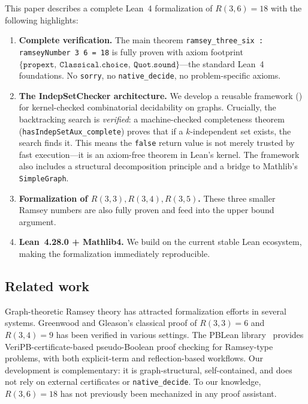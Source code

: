 \documentclass[11pt]{article}
\newcommand{\lean}[1]{\texttt{#1}}
\newcommand{\RR}[2]{R(#1,#2)}
\begin{document}
This paper describes a complete Lean~4 formalization of $R(3,6) = 18$
with the following highlights:

\begin{enumerate}
\item \textbf{Complete verification.}
  The main theorem \lean{ramsey\_three\_six : ramseyNumber 3 6 = 18} is fully
  proven with axiom footprint
  $\{\lean{propext},\ \lean{Classical.choice},\ \lean{Quot.sound}\}$---the
  standard Lean~4 foundations.
  No \lean{sorry}, no \lean{native\_decide}, no problem-specific axioms.

\item \textbf{The IndepSetChecker architecture.}
  We develop a reusable framework () for kernel-checked
  combinatorial decidability on graphs.
  Crucially, the backtracking search is \emph{verified}: a machine-checked
  completeness theorem (\lean{hasIndepSetAux\_complete}) proves that
  if a $k$-independent set exists, the search finds it.
  This means the \lean{false} return value is not merely trusted by fast
  execution---it is an axiom-free theorem in Lean's kernel.
  The framework also includes a structural decomposition principle and a
  bridge to Mathlib's \lean{SimpleGraph}.

\item \textbf{Formalization of $\RR{3}{3}, \RR{3}{4}, \RR{3}{5}$.}
  These three smaller Ramsey numbers are also fully proven and feed into the
  upper bound argument.

\item \textbf{Lean~4.28.0 + Mathlib4.}
  We build on the current stable Lean ecosystem,
  making the formalization immediately reproducible.
\end{enumerate}

\subsection*{Related work}

Graph-theoretic Ramsey theory has attracted formalization efforts in several
systems.
Greenwood and Gleason's classical proof of $\RR{3}{3} = 6$ and $\RR{3}{4} = 9$
\cite{greenwood1955} has been verified in various settings.
The PBLean library~\cite{pblean} provides VeriPB-certificate-based
pseudo-Boolean proof checking for Ramsey-type problems, with both explicit-term
and reflection-based workflows.
Our development is complementary: it is graph-structural, self-contained, and
does not rely on external certificates or \lean{native\_decide}.
To our knowledge, $R(3,6) = 18$ has not previously been mechanized in any proof
assistant.
\end{document}
